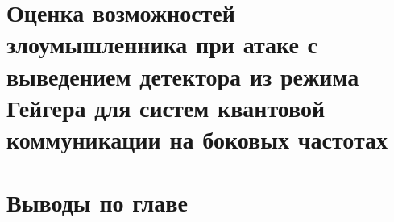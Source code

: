 \section{Оценка возможностей злоумышленника при атаке с выведением детектора из режима Гейгера для систем квантовой коммуникации на боковых частотах} \label{sec:ch2/sec12}



\section{Выводы по главе} \label{ch:ch2/sect13}
